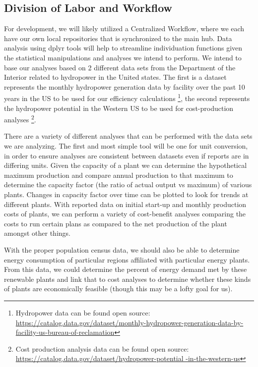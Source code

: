 \documentclass[11pt, oneside]{article}   	%
\begin{document}
\subsection*{Division of Labor and Workflow}
For development, we will likely utilized a Centralized Workflow, where we each have our own local repositories that is synchronized to the main hub. Data analysis using dplyr tools will help to streamline individuation functions given the statistical manipulations and analyses we intend to perform. We intend to base our analyses based on 2 different data sets from the Department of the Interior related to hydropower in the United states. The first is a dataset represents the monthly hydropower generation data by facility over the past 10 years in the US to be used for our efficiency calculations \footnote[3]{Hydropower data can be found open source: \url{https://catalog.data.gov/dataset/monthly-hydropower-generation-data-by- facility-us-bureau-of-reclamation}}, the second represents the hydropower potential in the Western US to be used for cost-production analyses \footnote[4]{Cost production analysis data can be found open source: \url{https://catalog.data.gov/dataset/hydropower-potential -in-the-western-us}}. 

There are a variety of different analyses that can be performed with the data sets we are analyzing. The first and most simple tool will be one for unit conversion, in order to ensure analyses are consistent between datasets even if reports are in differing units. Given the capacity of a plant we can determine the hypothetical maximum production and compare annual production to that maximum to determine the capacity factor (the ratio of actual output vs maximum) of various plants. Changes in capacity factor over time can be plotted to look for trends at different plants. With reported data on initial start-up and monthly production costs of plants, we can perform a variety of cost-benefit analyses comparing the costs to run certain plans as compared to the net production of the plant amongst other things. 

With the proper population census data, we should also be able to determine energy consumption of particular regions affiliated with particular energy plants. From this data, we could determine the percent of energy demand met by these renewable plants and link that to cost analyses to determine whether these kinds of plants are economically feasible (though this may be a lofty goal for us).
\end{document}
